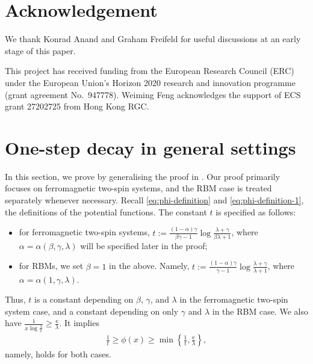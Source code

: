 \documentclass[11pt]{amsart}
\newcommand{\defeq}{:=}
\theoremstyle{definition}
\theoremstyle{remark}
\begin{document}
\ifdoubleblind
\else
  \section*{Acknowledgement}
    We thank Konrad Anand and Graham Freifeld for useful discussions at an early stage of this paper.

    This project has received funding from the European Research Council (ERC) under the European Union's Horizon 2020 research and innovation programme (grant agreement No.~947778).
    Weiming Feng acknowledges the support of ECS grant 27202725 from Hong Kong RGC.
\fi




\appendix

\section{One-step decay in general settings}\label{sec:decay-general}
In this section, we prove  by generalising the proof in \cite{GuoL18}. Our proof primarily focuses on ferromagnetic two-spin systems, and the RBM case is treated separately whenever necessary. 
Recall \eqref{eq:phi-definition} and \eqref{eq:phi-definition-1}, the definitions of the potential functions.
The constant $t$ is specified as follows:
\begin{itemize}
  \item for ferromagnetic two-spin systems, $t\defeq\frac{(1-\alpha)\gamma}{\beta\gamma-1}\log\frac{\lambda+\gamma}{\beta \lambda+1}$, where $\alpha = \alpha(\beta,\gamma,\lambda)$ will be specified later in the proof;
  \item for RBMs, we set $\beta=1$ in the above. Namely, $t\defeq\frac{(1-\alpha)\gamma}{\gamma-1}\log\frac{\lambda+\gamma}{\lambda+1}$, where $\alpha = \alpha(1, \gamma, \lambda)$.
\end{itemize}

Thus, $t$ is a constant depending on $\beta$, $\gamma$, and $\lambda$ in the ferromagnetic two-spin system case, and a constant depending on only $\gamma$ and $\lambda$ in the RBM case. We also have $\frac{1}{x\log \frac{\lambda}{x}}\geq \frac{\mathrm{e}}{\lambda}$.
It implies
\begin{align*}
  \frac{1}{t}\ge \phi(x) \ge \min\left\{\frac{1}{t},\frac{\mathrm{e}}{\lambda}\right\},
\end{align*}
namely,  holds for both cases. 
\end{document}
